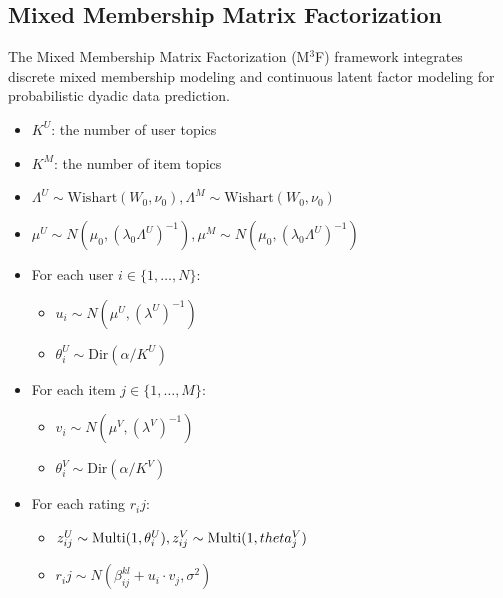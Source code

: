\documentclass{article}
\begin{document}
\subsection{Mixed Membership Matrix Factorization}
The Mixed Membership Matrix Factorization (M$^3$F) framework integrates discrete mixed membership modeling and continuous latent factor modeling for probabilistic dyadic data prediction.





 \begin{itemize}
                \item $K^U$: the number of user topics
                \item $K^M$: the number of item topics
                \item $\Lambda^U \sim \text{Wishart}(W_0, \nu_0), \Lambda^M \sim \text{Wishart}(W_0, \nu_0)$
                \item $\mu^U \sim N(\mu_0, (\lambda_0 \Lambda^U)^{-1}), \mu^M \sim N(\mu_0, (\lambda_0 \Lambda^U)^{-1})$

                \item For each user $i \in \{1, \ldots, N\}$: \\
                \begin{itemize}
                        \item $u_i \sim N(\mu^U, (\lambda^U)^{-1})$
                        \item $\theta_i^U \sim \text{Dir}(\alpha/K^U)$
                \end{itemize}

                \item For each item $j \in \{1, \ldots, M\}$:
                \begin{itemize}
                        \item $v_i \sim N(\mu^V, (\lambda^V)^{-1})$
                        \item $\theta_i^V \sim \text{Dir}(\alpha/K^V)$
                \end{itemize}

                \item For each rating $r_ij$:
                \begin{itemize}
                        \item $z_{ij}^U \sim \text{Multi}(1, \theta_i^U), z_{ij}^V \sim \text{Multi}(1, \\
theta_j^V)$
                        \item $r_ij \sim N(\beta_{ij}^{kl} + u_i \cdot v_j, \sigma^2)$
                \end{itemize}
        \end{itemize}
\end{document}
